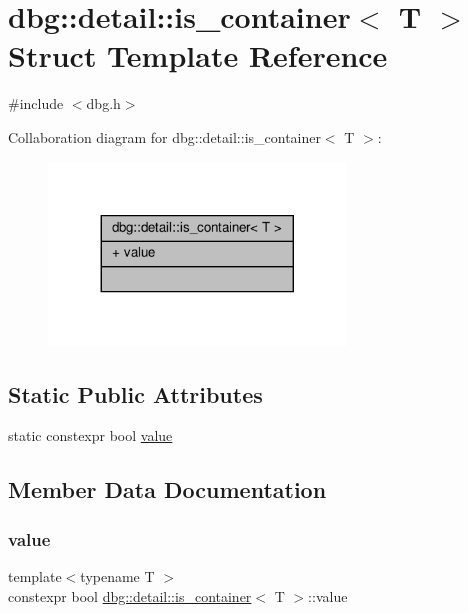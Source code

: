 \hypertarget{structdbg_1_1detail_1_1is__container}{}\section{dbg\+:\+:detail\+:\+:is\+\_\+container$<$ T $>$ Struct Template Reference}
\label{structdbg_1_1detail_1_1is__container}


{\ttfamily \#include $<$dbg.\+h$>$}



Collaboration diagram for dbg\+:\+:detail\+:\+:is\+\_\+container$<$ T $>$\+:\nopagebreak
\begin{figure}[H]
\begin{center}
\leavevmode
\includegraphics[width=224pt]{d3/d97/structdbg_1_1detail_1_1is__container__coll__graph}
\end{center}
\end{figure}
\subsection*{Static Public Attributes}
\begin{DoxyCompactItemize}
\item 
static constexpr bool \hyperlink{structdbg_1_1detail_1_1is__container_aa9a4594488352384b65b36198ac414f8}{value}
\end{DoxyCompactItemize}


\subsection{Member Data Documentation}
\mbox{\label{structdbg_1_1detail_1_1is__container_aa9a4594488352384b65b36198ac414f8}} 
\subsubsection{\texorpdfstring{value}{value}}
{\footnotesize\ttfamily template$<$typename T $>$ \\
constexpr bool \hyperlink{structdbg_1_1detail_1_1is__container}{dbg\+::detail\+::is\+\_\+container}$<$ T $>$\+::value\hspace{0.3cm}{\ttfamily [static]}}


